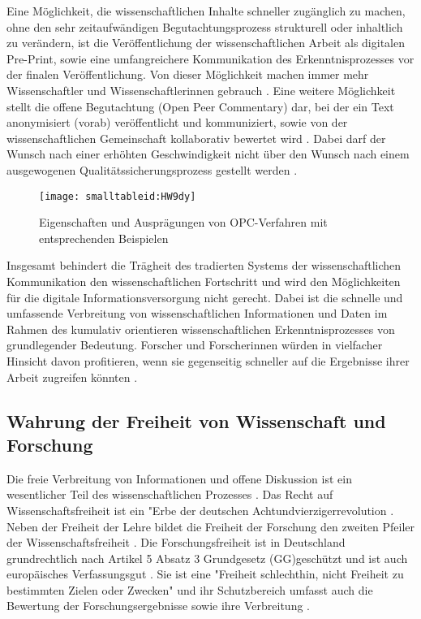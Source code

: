 Eine Möglichkeit, die wissenschaftlichen Inhalte schneller zugänglich zu machen, ohne den sehr zeitaufwändigen Begutachtungsprozess strukturell oder inhaltlich zu verändern, ist die Veröffentlichung der wissenschaftlichen Arbeit als digitalen Pre-Print, sowie eine umfangreichere Kommunikation des Erkenntnisprozesses vor der finalen Veröffentlichung. Von dieser Möglichkeit machen immer mehr Wissenschaftler und Wissenschaftlerinnen gebrauch \cite{Curry_2015}. Eine weitere Möglichkeit stellt die offene Begutachtung (Open Peer Commentary) dar, bei der ein Text anonymisiert (vorab) veröffentlicht und kommuniziert, sowie von der wissenschaftlichen Gemeinschaft kollaborativ bewertet wird \cite{Mueller_2009} \cite{Smith_2006}. Dabei darf der Wunsch nach einer erhöhten Geschwindigkeit nicht über den Wunsch nach einem ausgewogenen Qualitätssicherungsprozess gestellt werden \cite{Beall_2012}.

\begin{figure}[h!]
\texttt{[image: smalltableid:HW9dy]}
\caption{Eigenschaften und Ausprägungen von OPC-Verfahren mit entsprechenden Beispielen}
\end{figure}

Insgesamt behindert die Trägheit des tradierten Systems der wissenschaftlichen Kommunikation den wissenschaftlichen Fortschritt und wird den Möglichkeiten für die digitale Informationsversorgung nicht gerecht. Dabei ist die schnelle und umfassende Verbreitung von wissenschaftlichen Informationen und Daten im Rahmen des kumulativ orientieren wissenschaftlichen Erkenntnisprozesses von grundlegender Bedeutung. Forscher und Forscherinnen würden in vielfacher Hinsicht davon profitieren, wenn sie gegenseitig schneller auf die Ergebnisse ihrer Arbeit zugreifen könnten \cite{Nosek_2012} \cite{Winkler_2011}.

\subsection{Wahrung der Freiheit von Wissenschaft und Forschung}

Die freie Verbreitung von Informationen und offene Diskussion ist ein wesentlicher Teil des wissenschaftlichen Prozesses \cite{edsall_1976_scientific}. Das Recht auf Wissenschaftsfreiheit ist ein "Erbe der deutschen Achtundvierzigerrevolution \cite{kempny_2013_wissfreiheit}. Neben der Freiheit der Lehre bildet die Freiheit der Forschung den zweiten Pfeiler der Wissenschaftsfreiheit \cite{thurnherr_2014_pubfreiheit}. Die Forschungsfreiheit ist in Deutschland grundrechtlich nach Artikel 5 Absatz 3 Grundgesetz (GG)geschützt und ist auch europäisches Verfassungsgut \cite{kempny_2013_wissfreiheit}. Sie ist eine "Freiheit schlechthin, nicht Freiheit zu bestimmten Zielen oder Zwecken" \cite{Boeckenfoerde_1974} und ihr Schutzbereich umfasst auch die Bewertung der Forschungsergebnisse sowie ihre Verbreitung \cite{Pfeiffer_2013_forschungsfreiheit}.

